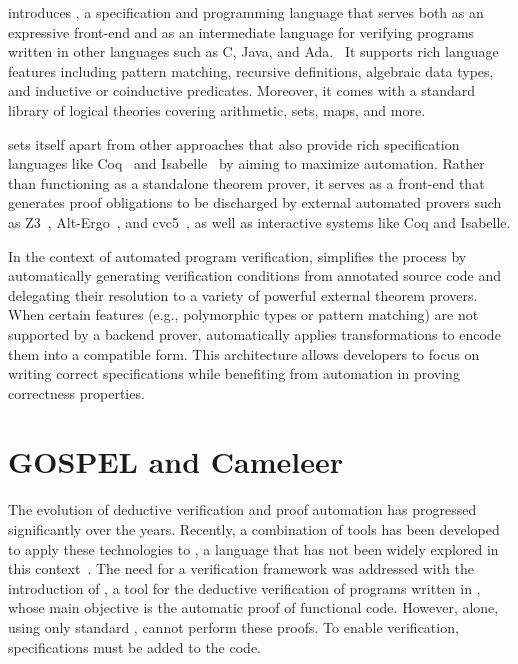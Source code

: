\whythree introduces \whyml, a specification and programming language that serves both as an expressive front-end and as 
an intermediate language for verifying programs written in other languages such as C, Java, and Ada.~\cite{FilliatreP13} 
It supports rich language features including pattern matching, recursive definitions, algebraic data types, and inductive or 
coinductive predicates. Moreover, it comes with a standard library of logical theories covering arithmetic, sets, maps, 
and more.

\whythree sets itself apart from other approaches that also provide rich specification languages like \textsf{Coq}~\cite{75277.75285} and 
\textsf{Isabelle}~\cite{Jacobsen_2023} by aiming to maximize automation. Rather than functioning as a standalone theorem prover, it serves 
as a front-end that generates proof obligations to be discharged by external automated provers such as Z3~\cite{MouraB08}, Alt-Ergo~\cite{ConchonIM17}, 
and cvc5~\cite{BarbosaBBKLMMMN22}, as well as interactive systems like \textsf{Coq} and \textsf{Isabelle}.

In the context of automated program verification, \whythree simplifies the process by automatically generating verification 
conditions from annotated source code and delegating their resolution to a variety of powerful external theorem provers. 
When certain features (e.g., polymorphic types or pattern matching) are not supported by a backend prover, \whythree automatically 
applies transformations to encode them into a compatible form. This architecture allows developers to focus on writing 
correct specifications while benefiting from automation in proving correctness properties.~\cite{boogie11why3}

\section{GOSPEL and Cameleer}
\label{sec:Cameleer}

The evolution of deductive verification and proof automation has progressed significantly over the years. Recently, a 
combination of tools has been developed to apply these technologies to \ocaml, a language that has not been widely explored in 
this context~\cite{PereiraR20}. The need for a verification framework was addressed with the introduction of \cameleer, a tool 
for the deductive verification of programs written in \ocaml, whose main objective is the automatic proof of functional code. 
However, \cameleer alone, using only standard \ocaml, cannot perform these proofs. To enable verification, \gospel specifications 
must be added to the \ocaml code.


